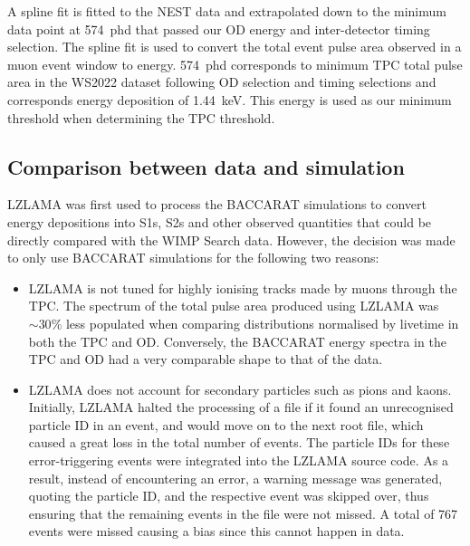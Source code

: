 A spline fit is fitted to the NEST data and extrapolated down to the minimum data point at 574~phd that passed our OD energy and inter-detector timing selection. The spline fit is used to convert the total event pulse area observed in a muon event window to energy. 574~phd corresponds to minimum TPC total pulse area in the WS2022 dataset following OD selection and timing selections and corresponds energy deposition of 1.44~keV. This energy is used as our minimum threshold when determining the TPC threshold.

\subsection{Comparison between data and simulation}\label{sec:Muons/MuonFluxDataSimComp}
LZLAMA was first used to process the BACCARAT simulations to convert energy depositions into S1s, S2s and other observed quantities that could be directly compared with the WIMP Search data. However, the decision was made to only use BACCARAT simulations for the following two reasons:
\begin{itemize}
    \item LZLAMA is not tuned for highly ionising tracks made by muons through the TPC. The spectrum of the total pulse area produced using LZLAMA was $\sim30\%$ less populated when comparing distributions normalised by livetime in both the TPC and OD. Conversely, the BACCARAT energy spectra in the TPC and OD had a very comparable shape to that of the data.
    \item LZLAMA does not account for secondary particles such as pions and kaons. Initially, LZLAMA halted the processing of a file if it found an unrecognised particle ID in an event, and would move on to the next root file, which caused a great loss in the total number of events. The particle IDs for these error-triggering events were integrated into the LZLAMA source code. As a result, instead of encountering an error, a warning message was generated, quoting the particle ID, and the respective event was skipped over, thus ensuring that the remaining events in the file were not missed. A total of 767 events were missed causing a bias since this cannot happen in data. 
\end{itemize}
